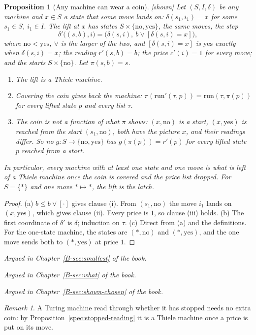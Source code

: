 \documentclass[11pt, a4paper]{article}
\theoremstyle{plain}
\newtheorem{proposition}[theorem]{Proposition}
\theoremstyle{definition}
\theoremstyle{remark}
\newtheorem{remark}[theorem]{Remark}
\newcommand{\Bool}{\{\mathrm{no},\mathrm{yes}\}}
\newcommand{\step}{\delta}
\newcommand{\cost}{c}
\newcommand{\rd}{r}
\newcommand{\run}{\mathrm{run}}
\newcommand{\argued}[1]{\par\noindent\textit{Argued in Chapter~\ref{B-#1} of the book.}\par}
\newcommand{\kind}[1]{\textup{[#1]}}
\begin{document}
\begin{proposition}[Any machine can wear a coin]\label{spec:coin-lift} \kind{shown}
Let $(S,I,\step)$ be any machine and $x\in S$ a state that some move lands on: $\step(s_1,i_1)=x$ for
some $s_1\in S$, $i_1\in I$. The \emph{lift at $x$} has states $S\times\Bool$, the same moves, the step
\[
\step'\bigl((s,b),i\bigr)=\bigl(\step(s,i),\ b\vee[\step(s,i)=x]\bigr),
\]
where $\mathrm{no}<\mathrm{yes}$, $\vee$ is the larger of the two, and $[\step(s,i)=x]$ is $\mathrm{yes}$
exactly when $\step(s,i)=x$; the reading $\rd'(s,b)=b$; the price $\cost'(i)=1$ for every move; and the
starts $S\times\{\mathrm{no}\}$. Let $\pi(s,b)=s$.
\begin{enumerate}[label=(\alph*)]
\item The lift is a Thiele machine.
\item Covering the coin gives back the machine: $\pi(\run'(\tau,p))=\run(\tau,\pi(p))$ for every lifted
state $p$ and every list $\tau$.
\item The coin is not a function of what $\pi$ shows: $(x,\mathrm{no})$ is a start, $(x,\mathrm{yes})$ is
reached from the start $(s_1,\mathrm{no})$, both have the picture $x$, and their readings differ. So no
$g:S\to\Bool$ has $g(\pi(p))=\rd'(p)$ for every lifted state $p$ reached from a start.
\end{enumerate}
In particular, every machine with at least one state and one move is what is left of a Thiele machine
once the coin is covered and the price list dropped. For $S=\{\ast\}$ and one move $\ast\mapsto\ast$, the
lift is the latch.
\end{proposition}

\begin{proof}
(a) $b\le b\vee[\cdot]$ gives clause (i). From $(s_1,\mathrm{no})$ the move $i_1$ lands on
$(x,\mathrm{yes})$, which gives clause (ii). Every price is $1$, so clause (iii) holds. (b) The first
coordinate of $\step'$ is $\step$; induction on $\tau$. (c) Direct from (a) and the definitions. For the
one-state machine, the states are $(\ast,\mathrm{no})$ and $(\ast,\mathrm{yes})$, and the one move sends
both to $(\ast,\mathrm{yes})$ at price $1$.
\end{proof}

\argued{sec:smallest}
\argued{sec:what}
\argued{sec:shown-chosen}

\begin{remark}
A Turing machine read through whether it has stopped needs no extra coin: by
Proposition~\ref{spec:stopped-reading} it is a Thiele machine once a price is put on its move.
\end{remark}
\end{document}
